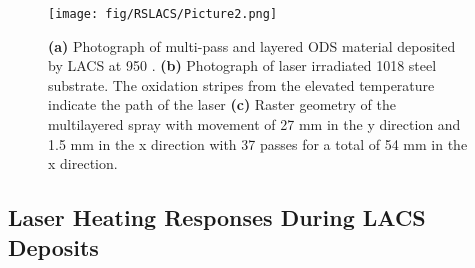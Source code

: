 		\begin{figure}
			\centering
			\texttt{[image: fig/RSLACS/Picture2.png]}
			\caption[\textbf{(a)} Photograph of multi-pass and layered ODS material deposited by LACS at 950 \celsius{}. \textbf{(b) }Photograph of laser irradiated 1018 steel substrate.]{\textbf{(a)} Photograph of multi-pass and layered ODS material deposited by LACS at 950 \celsius{}. \textbf{(b) }Photograph of laser irradiated 1018 steel substrate. The oxidation stripes from the elevated temperature indicate the path of the laser \textbf{(c)} Raster geometry of the multilayered spray with movement of 27 mm in the y direction and 1.5 mm in the x direction with 37 passes for a total of 54 mm in the x direction.}
			\label{fig:RSLACS2}
		\end{figure}
		
		
	
	
	\subsection*{Laser Heating Responses During LACS Deposits}
	
